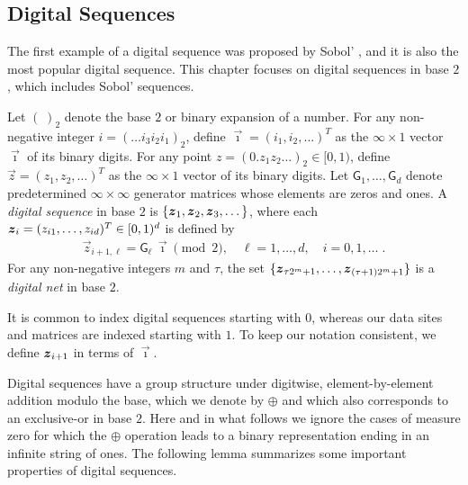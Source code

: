 \documentclass[graybox,footinfo]{svmult}
\begin{document}
\subsection{Digital Sequences} \label{FJ:sec:sobol}


The first example of a digital sequence was proposed by Sobol' \cite{Sob67}, and it is also the most popular digital sequence. This chapter focuses on digital sequences in base $2$, which includes Sobol' sequences. 

\begin{definition} \label{FJ:def:digitalseq}  Let  ${(\;)}_2$ denote the base $2$ or binary expansion of a number.
	For any non-negative integer $i = (\dots i_3 i_2 i_1)_2$, define $\overrightarrow{\imath} = (i_1, i_2, \dots)^T$ as the $\infty \times 1$ vector $\overrightarrow{\imath}$ of its binary digits. 
	For any point $z = ({0.z_1 z_2 \dots })_2 \in [0, 1)$, define $\overrightarrow{z} = (z_1, z_2, \dots)^T$ as the $\infty \times 1$ vector of its binary digits. 
	Let $ \mathsf{G}_1, \dots , \mathsf{G}_d$ denote predetermined $\infty \times \infty$ generator matrices whose elements are zeros and ones. 
	A \emph{digital sequence} in base $2$ is $\{{\boldsymbol{z}}_1, {\boldsymbol{z}}_2, {\boldsymbol{z}}_3, \dots\}$, where each ${\boldsymbol{z}}_i = ( z_{i1}, \dots , z_{id})^T \in [0, 1)^d$ is defined by
	\begin{align*}
	\overrightarrow{z}_{i+1,\ell} = \mathsf{G}_{\ell} \, \overrightarrow{\imath} \pmod 2,  \quad \ell = 1, \dots, d, \quad i = 0, 1, \dots \;.
	\end{align*}
For any non-negative integers $m$ and $\tau$, the set $\{{\boldsymbol{z}}_{\tau 2^m +1}, \ldots, {\boldsymbol{z}}_{(\tau+1)2^m +1}\}$ is a \emph{digital net} in base $2$.
\end{definition}

It is common to index digital sequences starting with $0$, whereas our data sites and matrices  are indexed starting with $1$.  To keep our notation consistent, we define ${\boldsymbol{z}}_{i+1}$ in terms of $\overrightarrow{\imath}$.

Digital sequences have a group structure under digitwise, element-by-element addition modulo the base, which we denote by $\oplus$ and which also corresponds to an exclusive-or in base $2$. Here and in what follows we ignore the cases of measure zero for which the $\oplus$ operation leads to a binary representation ending in an infinite string of ones.  The following lemma summarizes some important properties of digital sequences. 
\end{document}
